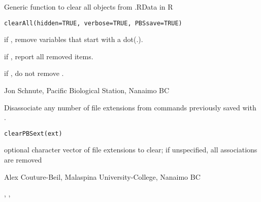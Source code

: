 \documentclass[letterpaper]{book}
\begin{document}
\begin{Description}\relax
Generic function to clear all objects from .RData in R
\end{Description}
\begin{Usage}
\begin{verbatim}
clearAll(hidden=TRUE, verbose=TRUE, PBSsave=TRUE)
\end{verbatim}
\end{Usage}
\begin{Arguments}
\begin{ldescription}
\item[\code{hidden}] if , remove variables that start with a dot(.).
\item[\code{verbose}] if , report all removed items.
\item[\code{PBSsave}] if , do not remove .
\end{ldescription}
\end{Arguments}
\begin{Author}\relax
Jon Schnute, Pacific Biological Station, Nanaimo BC
\end{Author}

\begin{Description}\relax
Disassociate any number of file extensions from commands previously saved
with .
\end{Description}
\begin{Usage}
\begin{verbatim}clearPBSext(ext)\end{verbatim}
\end{Usage}
\begin{Arguments}
\begin{ldescription}
\item[\code{ext}] optional character vector of file extensions to clear; if
unspecified, all associations are removed
\end{ldescription}
\end{Arguments}
\begin{Author}\relax
Alex Couture-Beil, Malaspina University-College, Nanaimo BC
\end{Author}
\begin{SeeAlso}\relax
{}, , 
\end{SeeAlso}
\end{document}
